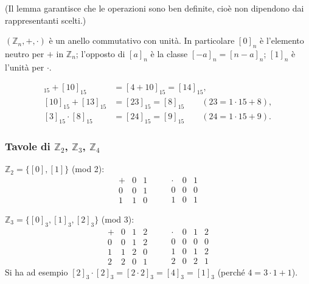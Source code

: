 \documentclass[11pt,a4paper]{article}
\begin{document}
(Il lemma garantisce che le operazioni sono ben definite, cioè non dipendono dai rappresentanti scelti.)

\begin{proposizione}
$(\mathbb{Z}_n, +, \cdot)$ è un anello commutativo con unità. In particolare $[0]_n$ è l'elemento neutro per $+$ in $\mathbb{Z}_n$; l'opposto di $[a]_n$ è la classe $[-a]_n = [n - a]_n$; $[1]_n$ è l'unità per $\cdot$.
\end{proposizione}

\begin{esempio}[in $\mathbb{Z}_{15}$]
\begin{align*}
  [4]_{15} + [10]_{15} &= [4 + 10]_{15} = [14]_{15},\\
  [10]_{15} + [13]_{15} &= [23]_{15} = [8]_{15} \qquad (23 = 1\cdot 15 + 8),\\
  [3]_{15}\cdot[8]_{15} &= [24]_{15} = [9]_{15} \qquad (24 = 1\cdot 15 + 9).
\end{align*}
\end{esempio}

\subsubsection{Tavole di $\mathbb{Z}_2$, $\mathbb{Z}_3$, $\mathbb{Z}_4$}

$\mathbb{Z}_2 = \{[0], [1]\}$ (mod 2):
\[
\begin{array}{c|cc} + & 0 & 1 \\ \hline 0 & 0 & 1 \\ 1 & 1 & 0 \end{array}
\qquad
\begin{array}{c|cc} \cdot & 0 & 1 \\ \hline 0 & 0 & 0 \\ 1 & 0 & 1 \end{array}
\]

$\mathbb{Z}_3 = \{[0]_3, [1]_3, [2]_3\}$ (mod 3):
\[
\begin{array}{c|ccc} + & 0 & 1 & 2 \\ \hline 0 & 0 & 1 & 2 \\ 1 & 1 & 2 & 0 \\ 2 & 2 & 0 & 1 \end{array}
\qquad
\begin{array}{c|ccc} \cdot & 0 & 1 & 2 \\ \hline 0 & 0 & 0 & 0 \\ 1 & 0 & 1 & 2 \\ 2 & 0 & 2 & 1 \end{array}
\]
Si ha ad esempio $[2]_3\cdot[2]_3 = [2\cdot 2]_3 = [4]_3 = [1]_3$ (perché $4 = 3\cdot 1 + 1$).
\end{document}
